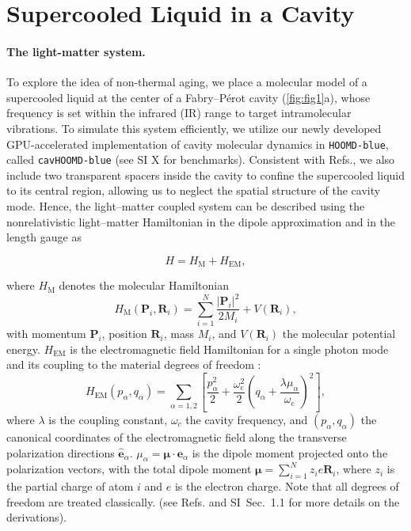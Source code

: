 \documentclass[aps, prl,
 reprint,
 superscriptaddress,
 citeautoscript,  %
 amsmath,amssymb,
 tightenlines
]{revtex4-2}
\begin{document}
\section*{Supercooled Liquid in a Cavity}

\paragraph*{The light-matter system.} To explore the idea of non-thermal aging, we place a molecular model of a supercooled liquid at the center of a Fabry–Pérot cavity (\cref{fig:fig1}a), whose frequency is set within the infrared (IR) range to target intramolecular vibrations. To simulate this system efficiently, we utilize our newly developed GPU-accelerated implementation of cavity molecular dynamics\cite{li2020cavity,li2021cavity} in \texttt{HOOMD-blue}\cite{anderson2020hoomd}, called \texttt{cavHOOMD-blue} (see SI X for benchmarks). 
Consistent with Refs.\cite{li2020cavity,li2021cavity}, we also include two transparent spacers inside the cavity to confine the supercooled liquid to its central region, allowing us to neglect the spatial structure of the cavity mode. Hence, the light–matter coupled system can be described using the nonrelativistic light–matter Hamiltonian in the dipole approximation and in the length gauge as

\begin{equation}
H = H_\mathrm{M}+H_\mathrm{EM},
\label{eq:tot_hamiltonian}
\end{equation}

where $H_\mathrm{M}$ denotes the molecular Hamiltonian
\begin{equation}
H_\mathrm{M}({ \bm P_i,\bm R_i }) = \sum_{i=1}^{N} \frac{|\bm P_i|^2}{2 M_i} +V({ \bm R_i}),
\end{equation}
with momentum $\bm{P}_i$, position $\bm{R}_i$, mass $M_i$, and $V({ \bm R_i })$ the molecular potential energy. $H_\mathrm{EM}$ is the electromagnetic field Hamiltonian for a single photon mode and its coupling to the material degrees of freedom \cite{li2020cavity,li2021cavity}:
\begin{equation}
H_\mathrm{EM} ({ p_\alpha, q_\alpha }) = \sum_{\alpha=1,2} \left[ \frac{p_\alpha^2}{2}+\frac{\omega_\mathrm{c}^2}{2} \left(q_\alpha +\frac{ \lambda \mu_\alpha}{\omega_\mathrm{c}} \right)^2 \right], \label{eq:Hem}
\end{equation}
where $\lambda$ is the coupling constant, $\omega_c$ the cavity frequency, and $(p_\alpha, q_\alpha)$ the canonical coordinates of the electromagnetic field along the transverse polarization directions ${\bm{\hat{e}}_\alpha}$. $\mu_\alpha = \bm \mu \cdot \bm e_\alpha$ is the dipole moment projected onto the polarization vectors, with the total dipole moment $\bm{\mu} = \sum_{i=1}^N z_i e \bm{R}_i$, where $z_i$ is the partial charge of atom $i$ and $e$ is the electron charge. Note that all degrees of freedom are treated classically. (see Refs.\cite{li2020cavity,li2021cavity} and SI~Sec.~1.1 for more details on the derivations). 
\end{document}
